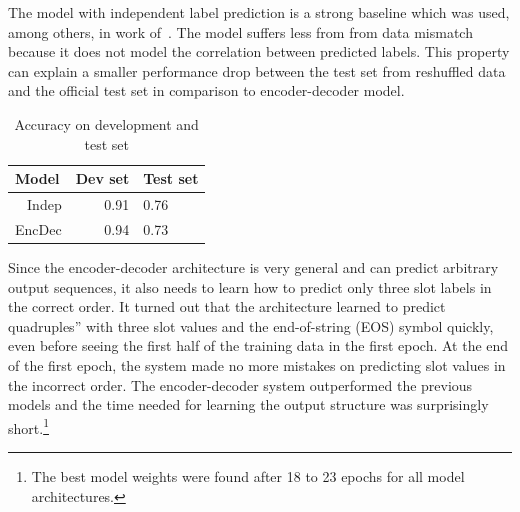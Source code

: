 \documentclass{itatnew}
\def\OD#1{{\color{darkgreen}OD: \it #1}}
\begin{document}
The model with independent label prediction is a strong baseline which was used, among others, in work of~\cite{zilka2015incremental}.
The model suffers less from from data mismatch because it does not model the correlation between predicted labels.
This property can explain a smaller performance drop between the test set from reshuffled data and the official test set in comparison to encoder-decoder model.

\begin{table}
\begin{center}
\begin{tabular}{r@{\quad}rll}
\hline
\multicolumn{1}{l}{\rule{0pt}{12pt}
                   Model}&\multicolumn{1}{l}{Dev set}&\multicolumn{2}{l}{Test set}\\[2pt]
\hline\rule{0pt}{12pt}
Indep  &   0.91 & 0.76 \\
EncDec &   0.94 & 0.73 \\
\hline
\end{tabular}
\caption{Accuracy on development and test set}
\vspace{-2em}
\end{center}
\label{tab:dstc}
\end{table}


Since the encoder-decoder architecture is very general and can predict arbitrary output sequences, it also needs to learn how to predict only three slot labels in the correct order.
It turned out that the architecture learned to predict quadruples” with three slot values and the end-of-string (EOS) symbol quickly, even before seeing the first half of the training data in the first epoch.
At the end of the first epoch, the system made no more mistakes on predicting slot values in the incorrect order.
The encoder-decoder system 
outperformed the previous models and the time needed for learning the output structure was surprisingly short.\footnote{The best model weights were found after 18 to 23 epochs for all model architectures.}
\end{document}
